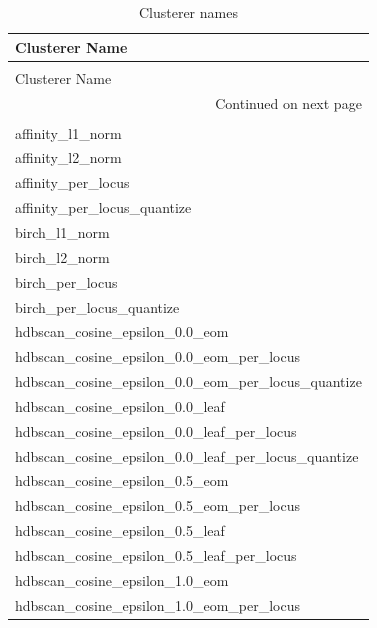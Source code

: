 \begin{longtable}{l}
\toprule
                                    Clusterer Name \\
\midrule
\endfirsthead
\caption[]{Clusterer names} \\
\toprule
                                    Clusterer Name \\
\midrule
\endhead
\midrule
\multicolumn{1}{r}{{Continued on next page}} \\
\midrule
\endfoot

\bottomrule
\caption{Clusterer names}
\label{table:Clusterer names}\\
\endlastfoot
                                  affinity\_l1\_norm \\
                                  affinity\_l2\_norm \\
                                affinity\_per\_locus \\
                       affinity\_per\_locus\_quantize \\
                                     birch\_l1\_norm \\
                                     birch\_l2\_norm \\
                                   birch\_per\_locus \\
                          birch\_per\_locus\_quantize \\
                    hdbscan\_cosine\_epsilon\_0.0\_eom \\
          hdbscan\_cosine\_epsilon\_0.0\_eom\_per\_locus \\
 hdbscan\_cosine\_epsilon\_0.0\_eom\_per\_locus\_quantize \\
                   hdbscan\_cosine\_epsilon\_0.0\_leaf \\
         hdbscan\_cosine\_epsilon\_0.0\_leaf\_per\_locus \\
hdbscan\_cosine\_epsilon\_0.0\_leaf\_per\_locus\_quantize \\
                    hdbscan\_cosine\_epsilon\_0.5\_eom \\
          hdbscan\_cosine\_epsilon\_0.5\_eom\_per\_locus \\
                   hdbscan\_cosine\_epsilon\_0.5\_leaf \\
         hdbscan\_cosine\_epsilon\_0.5\_leaf\_per\_locus \\
                    hdbscan\_cosine\_epsilon\_1.0\_eom \\
          hdbscan\_cosine\_epsilon\_1.0\_eom\_per\_locus \\

\end{longtable}
